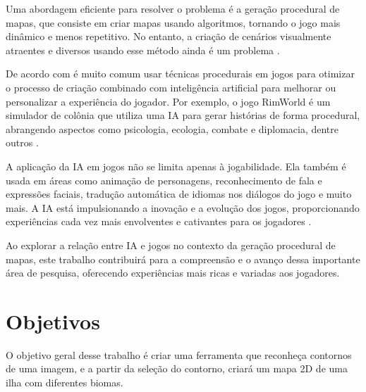 Uma abordagem eficiente para resolver o problema é a geração procedural de mapas, que consiste em criar mapas usando algoritmos, tornando o jogo mais dinâmico e menos repetitivo. No entanto, a criação de cenários visualmente atraentes e diversos usando esse método ainda é um problema \cite{geracao_procedural_jogos_2d}.

De acordo com  é muito comum usar técnicas procedurais em jogos para otimizar o processo de criação combinado com inteligência artificial para melhorar ou personalizar a experiência do jogador. Por exemplo, o jogo RimWorld é um simulador de colônia que utiliza uma IA para gerar histórias de forma procedural, abrangendo aspectos como psicologia, ecologia, combate e diplomacia, dentre outros \cite{jogo_procedural}.

A aplicação da IA em jogos não se limita apenas à jogabilidade. Ela também é usada em áreas como animação de personagens, reconhecimento de fala e expressões faciais, tradução automática de idiomas nos diálogos do jogo e muito mais. A IA está impulsionando a inovação e a evolução dos jogos, proporcionando experiências cada vez mais envolventes e cativantes para os jogadores \cite{exameNvidia, omniverseace}.

Ao explorar a relação entre IA e jogos no contexto da geração procedural de mapas, este trabalho contribuirá para a compreensão e o avanço dessa importante área de pesquisa, oferecendo experiências mais ricas e variadas aos jogadores. 




\section{Objetivos}

O objetivo geral desse trabalho é criar uma ferramenta que reconheça contornos de uma imagem, e a partir da seleção do contorno, criará um mapa 2D de uma ilha com diferentes biomas.

